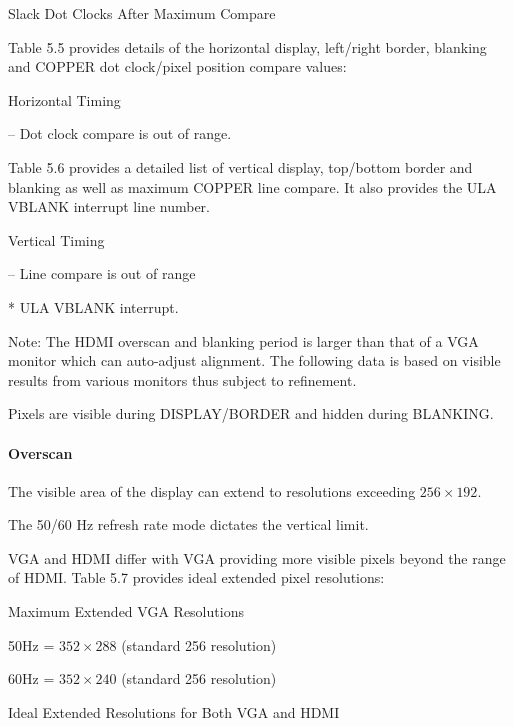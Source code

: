 \begin{table}[ht]\centering
  \caption{Slack Dot Clocks After Maximum Compare}
\end{table}

Table 5.5 provides details of the horizontal display, left/right
border, blanking and COPPER dot clock/pixel position compare values:

\begin{table}[ht]\centering
  \caption{Horizontal Timing}

  \raggedright -- Dot clock compare is out of range.
\end{table}

Table 5.6 provides a detailed list of vertical display, top/bottom
border and blanking as well as maximum COPPER line compare. It also
provides the ULA VBLANK interrupt line number.

\begin{table}[ht]\centering\tiny
  \caption{Vertical Timing}

  \raggedright -- Line compare is out of range

  * ULA VBLANK interrupt.
\end{table}

Note: The HDMI overscan and blanking period is larger than that of a
VGA monitor which can auto-adjust alignment. The following data is
based on visible results from various monitors thus subject to
refinement.

Pixels are visible during DISPLAY/BORDER and hidden during BLANKING.

\paragraph{Overscan}

The visible area of the display can extend to resolutions exceeding
$256\times192$.

The 50/60 Hz refresh rate mode dictates the vertical limit.

VGA and HDMI differ with VGA providing more visible pixels beyond the
range of HDMI. Table 5.7 provides ideal
extended pixel resolutions:

Maximum Extended VGA Resolutions

50Hz = $352\times288$ (standard 256 resolution)

60Hz = $352\times240$ (standard 256 resolution)

\begin{table}[ht]\centering
  \caption{Ideal Extended Resolutions for Both VGA and HDMI}
\end{table}

